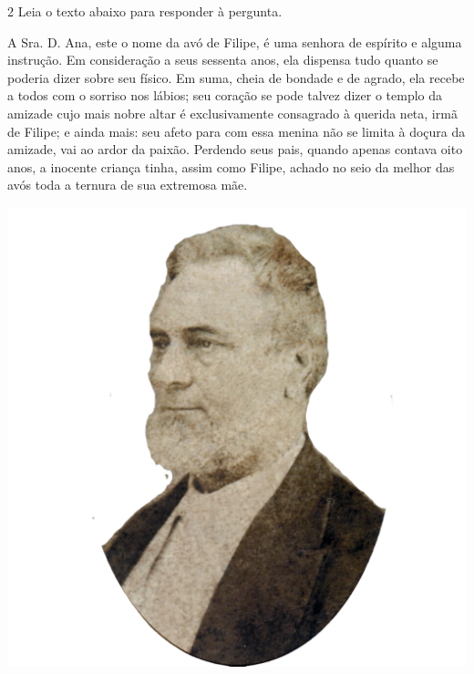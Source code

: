 \num{2} Leia o texto abaixo para responder à pergunta.

\begin{myquote}


\begin{minipage}{0.6\textwidth}
A Sra. D. Ana, este o nome da avó de Filipe, é uma senhora de espírito e
alguma instrução. Em consideração a seus sessenta anos, ela dispensa tudo
quanto se poderia dizer sobre seu físico. Em suma, cheia de bondade e de
agrado, ela recebe a todos com o sorriso nos lábios; seu coração se pode
talvez dizer o templo da amizade cujo mais nobre altar é exclusivamente
consagrado à querida neta, irmã de Filipe; e ainda mais: seu afeto para com
essa menina não se limita à doçura da amizade, vai ao ardor da paixão.
Perdendo seus pais, quando apenas contava oito anos, a inocente criança tinha,
assim como Filipe, achado no seio da melhor das avós toda a ternura de sua
extremosa mãe.
\end{minipage}
\hfill
\begin{minipage}{0.5\textwidth}
  \centering
  \includegraphics[width=\textwidth]{./imgSAEB_7_POR/media/image56.png}
\end{minipage}


\end{myquote}

